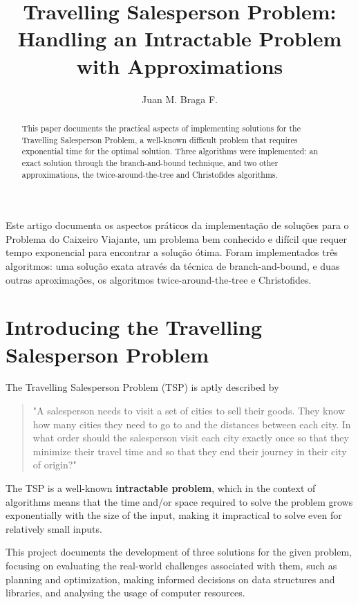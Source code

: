 \documentclass[12pt]{article}
\title{Travelling Salesperson Problem:\\ Handling an Intractable Problem with Approximations}
\author{Juan M. Braga F.\inst{1}}
\begin{document}
 

\maketitle

\begin{abstract}
  This paper documents the practical aspects of implementing solutions
  for the Travelling Salesperson Problem, a well-known difficult problem that requires
  exponential time for the optimal solution. Three algorithms were implemented:
  an exact solution through the branch-and-bound technique, and two other approximations,
  the twice-around-the-tree and Christofides algorithms.
\end{abstract}
     
\begin{resumo} 
  Este artigo documenta os aspectos práticos da implementação de soluções
  para o Problema do Caixeiro Viajante, um problema bem conhecido e difícil que requer
  tempo exponencial para encontrar a solução ótima. Foram implementados três algoritmos:
  uma solução exata através da técnica de branch-and-bound, e duas outras aproximações,
  os algoritmos twice-around-the-tree e Christofides.
\end{resumo}


\section{Introducing the Travelling Salesperson Problem} \label{sec:intro}

The Travelling Salesperson Problem (TSP) is aptly described by \cite{brilliant_explanation} 

\begin{quote}
  "A salesperson needs to visit a set of cities to sell their goods. They know how 
  many cities they need to go to and the distances between each city. In what order 
  should the salesperson visit each city exactly once so that they minimize their 
  travel time and so that they end their journey in their city of origin?"
\end{quote}

The TSP is a well-known \textbf{intractable problem}, which in the context of 
algorithms means that the time and/or space required to solve the problem grows 
exponentially with the size of the input, making it impractical to solve even for 
relatively small inputs.

This project documents the development of three solutions for the given problem, 
focusing on evaluating the real-world challenges associated with them, such as planning and 
optimization, making informed decisions on data structures and libraries, and 
analysing the usage of computer resources.
\end{document}
